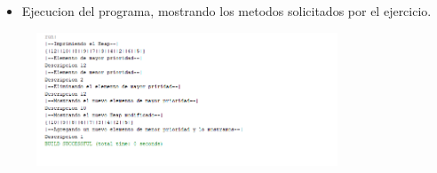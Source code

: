 \documentclass{article}
\begin{document}
	\begin{itemize}
		\item Ejecucion del programa, mostrando los metodos solicitados por el ejercicio.
	\end{itemize}
	\begin{figure}[H]
		\centering
\includegraphics[width=0.8\textwidth,keepaspectratio]{img/ejecucion.png}
	\end{figure}

	
	
%
%
%
			
\end{document}
